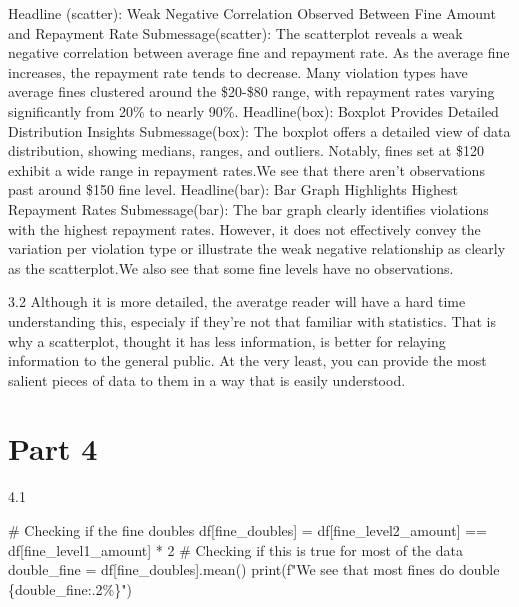\documentclass[
  letterpaper,
  DIV=11,
  numbers=noendperiod]{scrartcl}
\newenvironment{Shaded}{\begin{snugshade}}{\end{snugshade}}
\newcommand{\BuiltInTok}[1]{\textcolor[rgb]{0.00,0.23,0.31}{#1}}
\newcommand{\CommentTok}[1]{\textcolor[rgb]{0.37,0.37,0.37}{#1}}
\newcommand{\DecValTok}[1]{\textcolor[rgb]{0.68,0.00,0.00}{#1}}
\newcommand{\NormalTok}[1]{\textcolor[rgb]{0.00,0.23,0.31}{#1}}
\newcommand{\OperatorTok}[1]{\textcolor[rgb]{0.37,0.37,0.37}{#1}}
\newcommand{\SpecialCharTok}[1]{\textcolor[rgb]{0.37,0.37,0.37}{#1}}
\newcommand{\SpecialStringTok}[1]{\textcolor[rgb]{0.13,0.47,0.30}{#1}}
\newcommand{\StringTok}[1]{\textcolor[rgb]{0.13,0.47,0.30}{#1}}
\begin{document}
Headline (scatter): Weak Negative Correlation Observed Between Fine
Amount and Repayment Rate Submessage(scatter): The scatterplot reveals a
weak negative correlation between average fine and repayment rate. As
the average fine increases, the repayment rate tends to decrease. Many
violation types have average fines clustered around the \$20-\$80 range,
with repayment rates varying significantly from 20\% to nearly 90\%.
Headline(box): Boxplot Provides Detailed Distribution Insights
Submessage(box): The boxplot offers a detailed view of data
distribution, showing medians, ranges, and outliers. Notably, fines set
at \$120 exhibit a wide range in repayment rates.We see that there
aren't observations past around \$150 fine level. Headline(bar): Bar
Graph Highlights Highest Repayment Rates Submessage(bar): The bar graph
clearly identifies violations with the highest repayment rates. However,
it does not effectively convey the variation per violation type or
illustrate the weak negative relationship as clearly as the
scatterplot.We also see that some fine levels have no observations.

3.2 Although it is more detailed, the averatge reader will have a hard
time understanding this, especialy if they're not that familiar with
statistics. That is why a scatterplot, thought it has less information,
is better for relaying information to the general public. At the very
least, you can provide the most salient pieces of data to them in a way
that is easily understood.

\section{Part 4}\label{part-4}

4.1

\begin{Shaded}
\begin{Highlighting}[]
\CommentTok{\# Checking if the fine doubles}
\NormalTok{df[}\StringTok{\textquotesingle{}fine\_doubles\textquotesingle{}}\NormalTok{] }\OperatorTok{=}\NormalTok{ df[}\StringTok{\textquotesingle{}fine\_level2\_amount\textquotesingle{}}\NormalTok{] }\OperatorTok{==}\NormalTok{ df[}\StringTok{\textquotesingle{}fine\_level1\_amount\textquotesingle{}}\NormalTok{] }\OperatorTok{*} \DecValTok{2}
\CommentTok{\# Checking if this is true for most of the data}
\NormalTok{double\_fine }\OperatorTok{=}\NormalTok{ df[}\StringTok{\textquotesingle{}fine\_doubles\textquotesingle{}}\NormalTok{].mean()}
\BuiltInTok{print}\NormalTok{(}\SpecialStringTok{f"We see that most fines do double }\SpecialCharTok{\{}\NormalTok{double\_fine}\SpecialCharTok{:.2\%\}}\SpecialStringTok{"}\NormalTok{)}
\end{Highlighting}
\end{Shaded}
\end{document}
